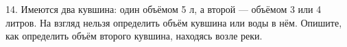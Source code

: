 14. Имеются два кувшина: один объёмом 5 л, а второй --- объёмом 3 или 4 литров. На взгляд нельзя определить объём кувшина или воды в нём. Опишите, как определить объём второго кувшина, находясь возле реки.\\

